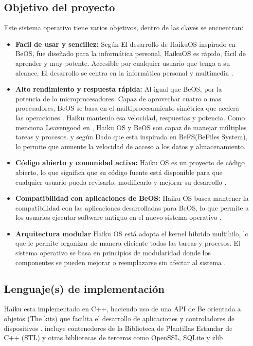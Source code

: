 \subsection{Objetivo del proyecto}
Este sistema operativo tiene varios objetivos, dentro de las claves se encuentran:
\begin{itemize}
    \item \textbf{Facil de usar y sencillez:} Según \citep{haiku_website_2025} El desarrollo de HaikuOS inspirado en BeOS, fue diseñado para la informática personal, HaikuOS es rápido, fácil de aprender y muy potente. Accesible por cualquier usuario que tenga a su alcance.
    El desarrollo se centra en la informática personal y multimedia \citep{Gonzales2017haiku}. 
    \item \textbf{Alto rendimiento y respuesta rápida:} Al igual que BeOS, por la potencia de lo microprocesadores. Capaz de aprovechar cuatro o mas procesadores, BeOS se basa en el multiprocesamiento simétrica que acelera las operaciones \citep{beinc_beos_datasheet}. Haiku mantenío esa velocidad, respuestas y potencia. Como menciona Leavengood en \citep{leavengood2012haiku}, Haiku OS  y BeOS son capaz de manejar múltiples tareas y procesos. y según \citep{Installing2024haiku} Dado que esta inspirada en BeFS(BeFiles System), lo permite que aumente la velocidad de acceso a los datos y almacenamiento.
    \item \textbf{Código abierto y comunidad activa:} Haiku OS es un proyecto de código abierto, lo que significa que su código fuente está disponible para que cualquier usuario pueda revisarlo, modificarlo y mejorar su desarrollo \citep{leavengood2012haiku}.
    \item \textbf{Compatibilidad con aplicaciones de BeOS:} Haiku OS busca mantener la compatibilidad con las aplicaciones desarrolladas para BeOS, lo que permite a los usuarios ejecutar software antiguo en el nuevo sistema operativo \citep{Gonzales2017haiku}.
    \item \textbf{Arquitectura modular} Haiku OS está adopta el kernel hibrido multihilo, lo que le permite organizar de manera eficiente todas las tareas  y procesos. El sistema operativo se basa en principios de modularidad donde los componentes se pueden mejorar o reemplazarse sin afectar al sistema \citep{tutorialspoint_haiku_os}.
\end{itemize}

\subsection{Lenguaje(s) de implementación}
Haiku esta implementado en C++, haciendo uso de una API de Be orientada a objetos (The kits) que facilita el desarrollo de aplicaciones y controladores de dispositivos \citep{leavengood2012haiku}.
incluye contenedores de la Biblioteca de Plantillas Estandar de C++ (STL) y otras bibliotecas de terceros como OpenSSL, SQLite y zlib \citep{haiku_website_2025}.

